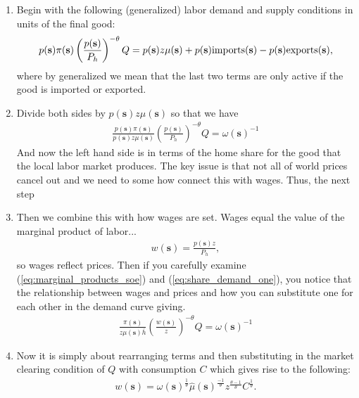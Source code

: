 \documentclass[pdftex,12pt]{article}
\begin{document}
\begin{enumerate}
\item Begin with the following (generalized) labor demand and supply conditions in units of the final good:
    \begin{align}
p(\textbf{s})\pi(\textbf{s}) \left(\frac{p(\textbf{s})}{P_h}\right)^{-\theta}Q=  p(\textbf{s}) z\mu(\textbf{s}) + p(\textbf{s})\mbox{\normalfont imports}(\textbf{s}) - p(\textbf{s})\mbox{\normalfont exports(\textbf{s})} ,
    \end{align}
where by generalized we mean that the last two terms are only active if the good is imported or exported.

\item Divide both sides by $p(\textbf{s})z\mu(\textbf{s})$ so that we have
    \begin{align}
\frac{p(\textbf{s})\pi(\textbf{s})}{p(\textbf{s})z\mu(\textbf{s})}  \left(\frac{p(\textbf{s})}{P_h}\right)^{-\theta}Q=  \omega(\textbf{s})^{-1}
\label{eq:share_demand_one}
    \end{align}
And now the left hand side is in terms of the home share for the good that the local labor market produces. The key issue is that not all of world prices cancel out and we need to some how connect this with wages. Thus, the next step

\item Then we combine this with how wages are set. Wages equal the value of the marginal product of labor...
\begin{align}
w(\textbf{s}) = \frac{p(\textbf{s}) z}{P_h},
\end{align}
so wages reflect prices. Then if you carefully examine (\ref{eq:marginal_products_soe}) and (\ref{eq:share_demand_one}), you notice that the relationship between wages and prices and how you can substitute one for each other in the demand curve giving.
\begin{align}
\frac{\pi(\textbf{s})}{z\mu(\textbf{s})\bar{h}}  \left(\frac{w(\textbf{s})}{z}\right)^{-\theta}Q=  \omega(\textbf{s})^{-1}
\end{align}

\item Now it is simply about rearranging terms and then substituting in the market clearing condition of $Q$ with consumption $C$ which gives rise to the following:
\begin{align}
 w(\textbf{s}) = \omega(\textbf{s})^{\frac{1}{\theta}} \hat \mu( \textbf{s})^{\frac{-1}{\theta}}z^{\frac{\theta-1}{\theta}} C^{\frac{1}{\theta}}.
\end{align}
\end{enumerate}
\end{document}
